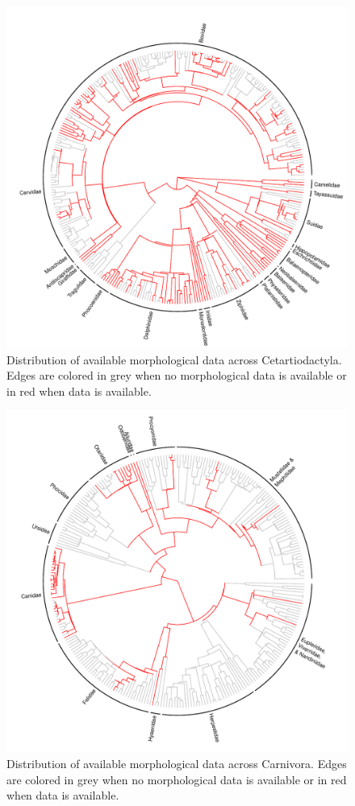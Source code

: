 \documentclass[12pt,letterpaper]{article}
\begin{document}
\begin{figure}[!htbp]
\centering
    \includegraphics[width=1\textwidth]{example_coverageA.pdf}
\caption{Distribution of available morphological data across Cetartiodactyla. Edges are colored in grey when no morphological data is available or in red when data is available.}
\label{Figure_example_coverageA}
\end{figure}

\begin{figure}[!htbp]
\centering
    \includegraphics[width=1\textwidth]{example_coverageB.pdf}
\caption{Distribution of available morphological data across Carnivora. Edges are colored in grey when no morphological data is available or in red when data is available.}
\label{Figure_example_coverageB}
\end{figure}
\end{document}
